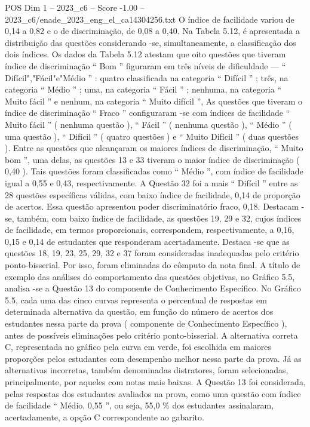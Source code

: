 \begin{textsample}{POS Dim 1 – 2023\_c6 – Score -1.00 – 2023\_c6/enade\_2023\_eng\_el\_ca14304256.txt}
O índice de facilidade variou de 0,14 a 0,82 e o de discriminação, de 0,08 a 0,40.
Na Tabela 5.12, é apresentada a distribuição das questões considerando -se, simultaneamente, a classificação dos dois índices.
Os dados da Tabela 5.12 atestam que oito questões que tiveram índice de discriminação “ Bom ” figuraram em três níveis de dificuldade — “ Difícil","Fácil"e"Médio ” : quatro classificada na categoria “ Difícil ” ; três, na categoria “ Médio ” ; uma, na categoria “ Fácil ” ; nenhuma, na categoria “ Muito fácil ” e nenhum, na categoria “ Muito difícil ”, As questões que tiveram o índice de discriminação “ Fraco ” configuraram -se com índices de facilidade “ Muito fácil ” ( nenhuma questão ), “ Fácil ” ( nenhuma questão ), “ Médio ” ( uma questão ), “ Difícil ” ( quatro questões ) e “ Muito Difícil ” ( duas questões ).
Entre as questões que alcançaram os maiores índices de discriminação, “ Muito bom ”, uma delas, as questões 13 e 33 tiveram o maior índice de discriminação ( 0,40 ).
Tais questões foram classificadas como “ Médio ”, com índice de facilidade igual a 0,55 e 0,43, respectivamente.
A Questão 32 foi a mais “ Difícil ” entre as 28 questões específicas válidas, com baixo índice de facilidade, 0,14 de proporção de acertos.
Essa questão apresentou poder discriminatório fraco, 0,18.
Destacam -se, também, com baixo índice de facilidade, as questões 19, 29 e 32, cujos índices de facilidade, em termos proporcionais, correspondem, respectivamente, a 0,16, 0,15 e 0,14 de estudantes que responderam acertadamente.
Destaca -se que as questões 18, 19, 23, 25, 29, 32 e 37 foram consideradas inadequadas pelo critério ponto-bisserial.
Por isso, foram eliminadas do cômputo da nota final.
A título de exemplo das análises do comportamento das questões objetivas, no Gráfico 5.5, analisa -se a Questão 13 do componente de Conhecimento Específico.
No Gráfico 5.5, cada uma das cinco curvas representa o percentual de respostas em determinada alternativa da questão, em função do número de acertos dos estudantes nessa parte da prova ( componente de Conhecimento Específico ), antes de possíveis eliminações pelo critério ponto-bisserial.
A alternativa correta C, representada no gráfico pela curva em verde, foi escolhida em maiores proporções pelos estudantes com desempenho melhor nessa parte da prova.
Já as alternativas incorretas, também denominadas distratores, foram selecionadas, principalmente, por aqueles com notas mais baixas.
A Questão 13 foi considerada, pelas respostas dos estudantes avaliados na prova, como uma questão com índice de facilidade “ Médio, 0,55 ”, ou seja, 55,0 \% dos estudantes assinalaram, acertadamente, a opção C correspondente ao gabarito.

\end{textsample}
